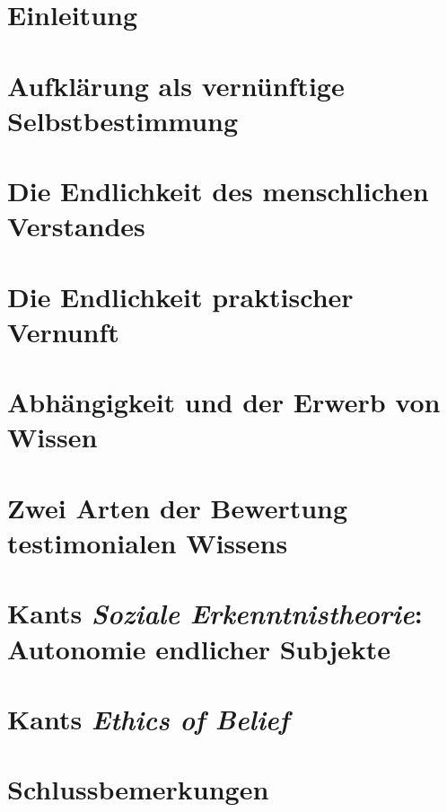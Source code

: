 

\chapter{Einleitung}

\chapter{Aufklärung als vernünftige Selbstbestimmung}\label{section:KantalsliberalerAufklaerer}


\chapter{Die Endlichkeit des menschlichen
Verstandes}\label{chapter:endlichkeitmenschlichendenkens}


\chapter{Die Endlichkeit praktischer
Vernunft}\label{chapter:AufklaerungundWissenschaft}


\chapter{Abhängigkeit und der Erwerb von
Wissen}\label{section:autonomieunddaszeugnisanderer}


\chapter{Zwei Arten der Bewertung testimonialen
Wissens}\label{chapter:MuendigerErwerbTestimonialenWissens}


\chapter{Kants \emph{Soziale
Erkenntnistheorie}: Autonomie endlicher
Subjekte}\label{Chapter:KantsSocialEpistemology}


\chapter{Kants \emph{Ethics of Belief}}\label{section:KantsEthicsofBelief}


\chapter{Schlussbemerkungen}\label{Schlussbemerkungen}


